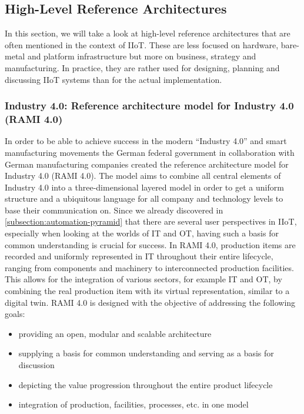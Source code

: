 \subsection{High-Level Reference Architectures}
\label{subsection:high-level-ref}
    In this section, we will take a look at high-level reference architectures that are often mentioned in the context of IIoT. These are less focused on hardware, bare-metal and platform infrastructure but more on business, strategy and manufacturing. In practice, they are rather used for designing, planning and discussing IIoT systems than for the actual implementation.
    
    \subsubsection*{Industry 4.0: Reference architecture model for Industry 4.0 (RAMI 4.0)}
    \label{subsubsection:rami-40}
        In order to be able to achieve success in the modern ``Industry 4.0'' and smart manufacturing movements the German federal government in collaboration with German manufacturing companies created the reference architecture model for Industry 4.0 (RAMI 4.0). The model aims to combine all central elements of Industry 4.0 into a three-dimensional layered model in order to get a uniform structure and a ubiquitous language for all company and technology levels to base their communication on. Since we already discovered in \autoref{subsection:automation-pyramid} that there are several user perspectives in IIoT, especially when looking at the worlds of IT and OT, having such a basis for common understanding is crucial for success. In RAMI 4.0, production items are recorded and uniformly represented in IT throughout their entire lifecycle, ranging from components and machinery to interconnected production facilities. This allows for the integration of various sectors, for example IT and OT, by combining the real production item with its virtual representation, similar to a digital twin. RAMI 4.0 is designed with the objective of addressing the following goals:

            \begin{itemize}
                \item providing an open, modular and scalable architecture
                \item supplying a basis for common understanding and serving as a basis for discussion
                \item depicting the value progression throughout the entire product lifecycle
                \item integration of production, facilities, processes, etc. in one model
            \end{itemize}

